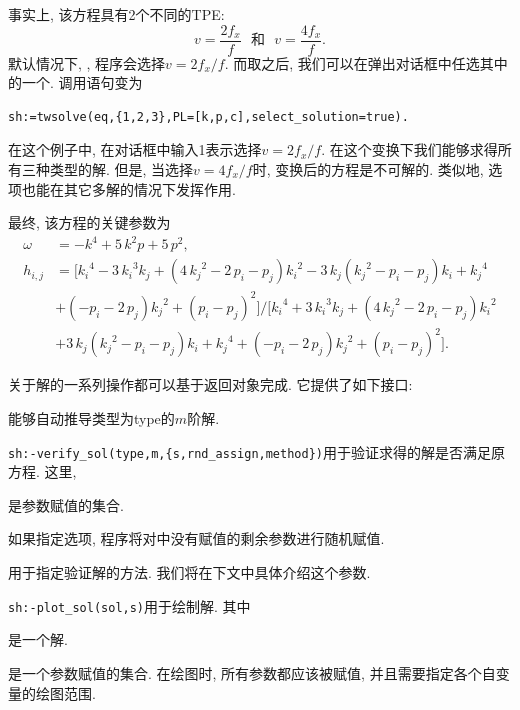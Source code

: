 事实上, 该方程具有2个不同的TPE:
\begin{equation}
v=\frac{2f_x}{f} \text{~~和~~} v=\frac{4f_x}{f}.
\end{equation}
默认情况下, , 程序会选择$v=2f_x/f$. 而取之后, 我们可以在弹出对话框中任选其中的一个. 调用语句变为
\begin{verbatim}
sh:=twsolve(eq,{1,2,3},PL=[k,p,c],select_solution=true).
\end{verbatim}
在这个例子中, 在对话框中输入1表示选择$v=2f_x/f$. 在这个变换下我们能够求得所有三种类型的解. 但是, 当选择$v=4f_x/f$时, 变换后的方程是不可解的. 类似地, 选项也能在其它多解的情况下发挥作用.

最终, 该方程的关键参数为
\begin{equation}
\begin{split}
\omega&=-{k}^{4}+5\,{k}^{2}p+5\,{p}^{2}, \\ 
h_{i,j}&=[{k_{{i}}}^{4}-3\,{k_{{i}}}^{3}k_{{j}}+ \left( 4\,{k_{{j}}}^{2}-2\,p_{{i}}-p_{{j}} \right) {k_{{i}}}^{2}-3\,k_{{j}} \left( {k_{{j}}}^{2}-p_{{i}}-p_{{j}} \right) k_{{i}}+{k_{{j}}}^{4}\\
&+\left( -p_{{i}}-2\,p_{{j}}\right) {k_{{j}}}^{2}+ \left( p_{{i}}-p_{{j}} \right) ^{2}]/[{k_{{i}}}^{4}+3\,{k_{{i}}}^{3}k_{{j}}+ \left( 4\,{k_{{j}}}^{2}-2\,p_{{i}}-p_{{j}} \right) {k_{{i}}}^{2}\\
&+3\,k_{{j}} \left( {k_{{j}}}^{2}-p_{{i}}-p_{{j}} \right) k_{{i}}+{k_{{j}}}^{4}+ \left( -p_{{i}}-2\,p_{{j}}\right) {k_{{j}}}^{2}+ \left( p_{{i}}-p_{{j}} \right) ^{2}].
\end{split}
\end{equation}

关于解的一系列操作都可以基于返回对象完成.  它提供了如下接口: 
\begin{compactitem}[\textbullet]
\item {}能够自动推导类型为type的$m$阶解. 
\item \verb|sh:-verify_sol(type,m,{s,rnd_assign,method})|用于验证求得的解是否满足原方程. 这里,
\begin{compactitem}[- ]
\item {}是参数赋值的集合.
\item 如果指定选项, 程序将对中没有赋值的剩余参数进行随机赋值.
\item {}用于指定验证解的方法. 我们将在下文中具体介绍这个参数. 
\end{compactitem}
\item \verb|sh:-plot_sol(sol,s)|用于绘制解. 其中
\begin{compactitem}[- ]
\item {} 是一个解. 
\item {} 是一个参数赋值的集合. 在绘图时, 所有参数都应该被赋值, 并且需要指定各个自变量的绘图范围.
\end{compactitem}
\end{compactitem}

